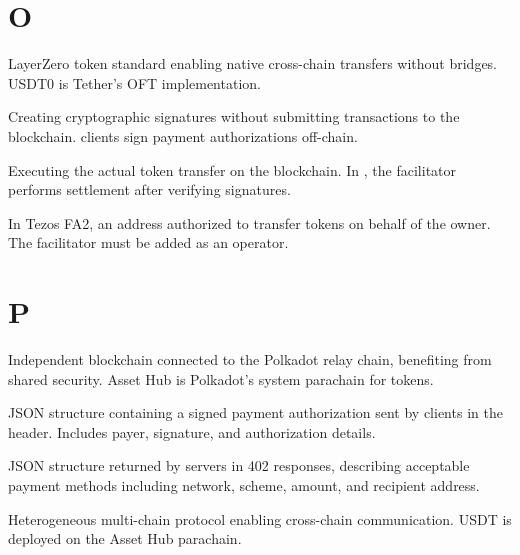 \section*{O}

\begin{description}[style=nextline]

\item[OFT (Omnichain Fungible Token)]
LayerZero token standard enabling native cross-chain transfers without bridges. USDT0 is Tether's OFT implementation.

\item[Off-chain Signing]
Creating cryptographic signatures without submitting transactions to the blockchain. \tprotocol{} clients sign payment authorizations off-chain.

\item[On-chain Settlement]
Executing the actual token transfer on the blockchain. In \tprotocol{}, the facilitator performs settlement after verifying signatures.

\item[Operator]
In Tezos FA2, an address authorized to transfer tokens on behalf of the owner. The facilitator must be added as an operator.

\end{description}

\section*{P}

\begin{description}[style=nextline]

\item[Parachain]
Independent blockchain connected to the Polkadot relay chain, benefiting from shared security. Asset Hub is Polkadot's system parachain for tokens.

\item[PaymentPayload]
JSON structure containing a signed payment authorization sent by clients in the  header. Includes payer, signature, and authorization details.

\item[PaymentRequired]
JSON structure returned by servers in 402 responses, describing acceptable payment methods including network, scheme, amount, and recipient address.

\item[Polkadot]
Heterogeneous multi-chain protocol enabling cross-chain communication. USDT is deployed on the Asset Hub parachain.

\end{description}

